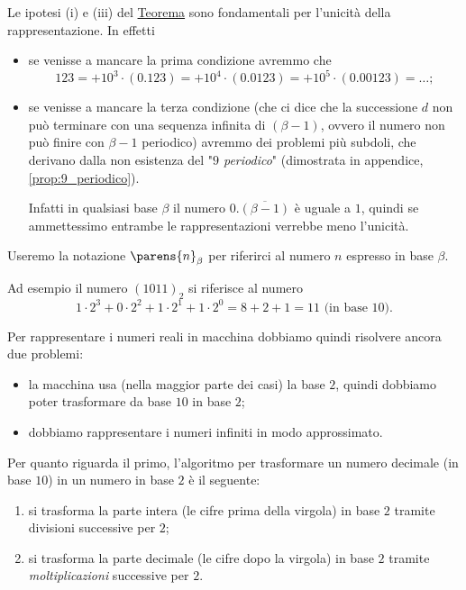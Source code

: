 \begin{remark} 
    Le ipotesi (i) e (iii) del \hyperref[th:rapp_base]{Teorema} sono fondamentali per l'unicità della rappresentazione. In effetti
    \begin{itemize}
        \item se venisse a mancare la prima condizione avremmo che \[
            123 = +10^3 \cdot (0.123) = +10^4 \cdot (0.0123) = +10^5 \cdot (0.00123) = \dots;
        \]
        \item se venisse a mancare la terza condizione 
        (che ci dice che la successione $d$ non può terminare con una sequenza infinita di $(\beta - 1)$, ovvero il numero non può finire con $\beta-1$ periodico) 
        avremmo dei problemi più subdoli, che derivano dalla non esistenza del "\emph{$9$ periodico}" (dimostrata in appendice, \autoref{prop:9_periodico}). 
        
        Infatti in qualsiasi base $\beta$ il numero $0.\overline{(\beta-1)}$ è uguale a $1$, quindi se ammettessimo entrambe le rappresentazioni verrebbe meno l'unicità.
    \end{itemize}
\end{remark}

\begin{notation}
    Useremo la notazione $\parens{n}_\beta$ per riferirci al numero $n$ espresso in base $\beta$. 
\end{notation}

Ad esempio il numero $(1011)_2$ si riferisce al numero \[
    1 \cdot 2^3 + 0 \cdot 2^2 + 1 \cdot 2^1 + 1 \cdot 2^0 = 8 + 2 + 1 = 11 \text{ (in base $10$).}
\]

Per rappresentare i numeri reali in macchina dobbiamo quindi risolvere ancora due problemi:
\begin{itemize}
    \item la macchina usa (nella maggior parte dei casi) la base $2$, quindi dobbiamo poter trasformare da base $10$ in base $2$;
    \item dobbiamo rappresentare i numeri infiniti in modo approssimato.
\end{itemize}

Per quanto riguarda il primo, l'algoritmo per trasformare un numero decimale (in base $10$) in un numero in base $2$ è il seguente:
\begin{enumerate}
    \item si trasforma la parte intera (le cifre prima della virgola) in base $2$ tramite divisioni successive per $2$;
    \item si trasforma la parte decimale (le cifre dopo la virgola) in base $2$ tramite \emph{moltiplicazioni} successive per $2$.
\end{enumerate}

